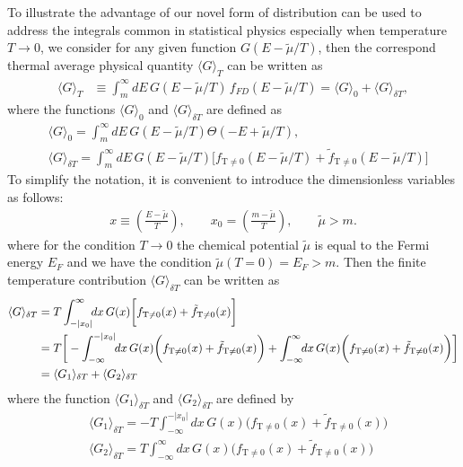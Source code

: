 \documentclass[sn-mathphys,Numbered]{sn-jnl}
\begin{document}
To illustrate the advantage of our novel form of distribution can be used to address the integrals common in statistical physics especially when temperature $T\to0$, we consider for any given function $G(E-\tilde\mu/T)$, then the correspond  thermal average physical quantity $\langle G\rangle_T$ can be written as
\begin{align}
\langle G\rangle_T&\equiv\int^{\infty}_{m}\!\!dE\,G(E-\tilde\mu/T)\,f_{FD}(E-\tilde\mu/T)=\langle G\rangle_{0}+\langle G\rangle_{\delta T},
\end{align}
where the functions $\langle G\rangle_{0}$ and $\langle G\rangle_{\delta T}$ are defined as
\begin{align}
&\langle G\rangle_{0}=\int^{\infty}_{m}\!\!dE\,G(E-\tilde\mu/T)\Theta(-E+\tilde\mu/T),\\
&\langle G\rangle_{\delta T}=\int^{\infty}_{m}\!\!dE\,G(E-\tilde\mu/T)\bigg[f_\mathrm{T\neq0}(E-\tilde\mu/T)+\tilde f_\mathrm{T\neq0}(E-\tilde\mu/T)\bigg]
\end{align}
To simplify the notation, it is convenient to introduce the dimensionless variables as follows:
\begin{align}
x\equiv\left(\frac{E-\tilde\mu}{T}\right), \qquad x_0=\left(\frac{m-\tilde\mu}{T}\right),\qquad \tilde\mu>m.
\end{align}
where for the condition $T\to0$ the chemical potential $\tilde\mu$ is equal to the Fermi energy $E_F$ and we have the condition $\tilde\mu(T=0)= E_F>m$. Then the finite temperature contribution $\langle G\rangle_{\delta T}$ can be written as
\begin{align}\label{G_deltaT}
\langle G\rangle_{\delta T}&=T\int_{-|x_0|}^\infty \!\!dx\,G(x)\bigg[f_\mathrm{T\neq0}(x)+\tilde f_\mathrm{T\neq0}(x)\bigg]\notag\\
&=T\bigg[-\int^{-|x_0|}_{-\infty}\!\!dx\,G(x)\bigg(f_\mathrm{T\neq0}(x)+\tilde f_\mathrm{T\neq0}(x)\bigg)+\int_{-\infty}^{\infty}\!\!dx\,G(x)\bigg(f_\mathrm{T\neq0}(x)+\tilde f_\mathrm{T\neq0}(x)\bigg)\bigg]\notag
\\&=\langle G_1\rangle_{\delta T}+\langle G_2\rangle_{\delta T}
\end{align}
where the function $\langle G_1\rangle_{\delta T}$ and $\langle G_2\rangle_{\delta T}$ are defined by
\begin{align}
&\langle G_1\rangle_{\delta T}=-T\int^{-|x_0|}_{-\infty}\!\!dx\,G(x)\bigg(f_\mathrm{T\neq0}(x)+\tilde f_\mathrm{T\neq0}(x)\bigg)\\
&\langle G_2\rangle_{\delta T}=T\int_{-\infty}^{\infty}\!\!dx\,G(x)\bigg(f_\mathrm{T\neq0}(x)+\tilde f_\mathrm{T\neq0}(x)\bigg)
\end{align}
\end{document}
